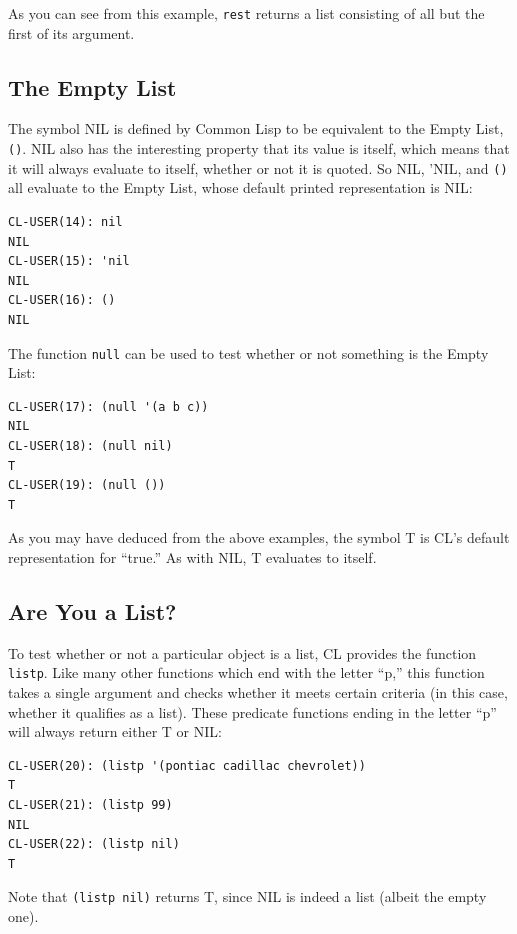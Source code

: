 As you can see from this example, \texttt{rest} returns a list consisting of all but the first of its
argument.

\subsection{The Empty List}

The symbol NIL is defined by Common Lisp to be equivalent to the Empty List, \texttt{()}. NIL
also has the interesting property that its value is itself, which means that it will always
evaluate to itself, whether or not it is quoted. So NIL, 'NIL, and \texttt{()} all evaluate to the
Empty List, whose default printed representation is NIL:

\begin{verbatim}
CL-USER(14): nil
NIL
CL-USER(15): 'nil
NIL
CL-USER(16): ()
NIL
\end{verbatim}

The function \texttt{null} can be used to test whether or not something is the Empty List:

\begin{verbatim}
CL-USER(17): (null '(a b c))
NIL
CL-USER(18): (null nil)
T
CL-USER(19): (null ())
T
\end{verbatim}

As you may have deduced from the above examples, the symbol T is CL's default representation for ``true.'' As with NIL, T evaluates to itself.

\subsection{Are You a List?}

To test whether or not a particular object is a list, CL provides the function \texttt{listp}. Like
many other functions which end with the letter ``p,'' this function takes a single argument
and checks whether it meets certain criteria (in this case, whether it qualifies as a list).
These predicate functions ending in the letter ``p'' will always return either T or NIL:

\begin{verbatim}
CL-USER(20): (listp '(pontiac cadillac chevrolet))
T
CL-USER(21): (listp 99)
NIL
CL-USER(22): (listp nil)
T
\end{verbatim}

Note that \texttt{(listp nil)} returns T, since NIL is indeed a list (albeit the empty one).

